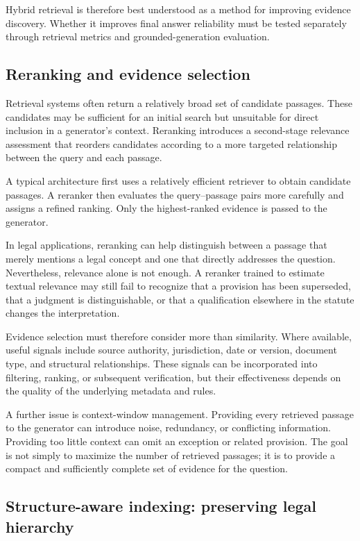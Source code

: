 Hybrid retrieval is therefore best understood as a method for improving evidence discovery. Whether it
improves final answer reliability must be tested separately through retrieval metrics and
grounded-generation evaluation.

\subsection{Reranking and evidence selection}

Retrieval systems often return a relatively broad set of candidate passages. These candidates may be
sufficient for an initial search but unsuitable for direct inclusion in a generator's context.
Reranking introduces a second-stage relevance assessment that reorders candidates according to a more
targeted relationship between the query and each passage.

A typical architecture first uses a relatively efficient retriever to obtain candidate passages. A
reranker then evaluates the query--passage pairs more carefully and assigns a refined ranking. Only
the highest-ranked evidence is passed to the generator.

In legal applications, reranking can help distinguish between a passage that merely mentions a legal
concept and one that directly addresses the question. Nevertheless, relevance alone is not enough. A
reranker trained to estimate textual relevance may still fail to recognize that a provision has been
superseded, that a judgment is distinguishable, or that a qualification elsewhere in the statute
changes the interpretation.

Evidence selection must therefore consider more than similarity. Where available, useful signals
include source authority, jurisdiction, date or version, document type, and structural relationships.
These signals can be incorporated into filtering, ranking, or subsequent verification, but their
effectiveness depends on the quality of the underlying metadata and rules.

A further issue is context-window management. Providing every retrieved passage to the generator can
introduce noise, redundancy, or conflicting information. Providing too little context can omit an
exception or related provision. The goal is not simply to maximize the number of retrieved passages;
it is to provide a compact and sufficiently complete set of evidence for the question.

\subsection{Structure-aware indexing: preserving legal hierarchy}

